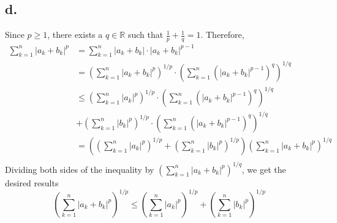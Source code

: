 \documentclass[11pt]{article}
\begin{document}
\subsection*{d.}
Since $p\ge 1$, there exists a $q \in \mathbb{R}$ such that $\frac{1}{p}+ \frac{1}{q} = 1$. Therefore, 
\begin{equation*}
    \begin{aligned}
        \sum_{k=1}^n |a_k + b_k|^p 
        &= \sum_{k=1}^n |a_k + b_k| \cdot |a_k+b_k|^{p-1} \\
        &= \left(\sum_{k=1}^n |a_k + b_k|^p \right)^{1/p} \cdot 
        \left( \sum_{k=1}^n (|a_k + b_k|^{p-1} )^q \right)^{1/q} \\
        &\le \left(\sum_{k=1}^n |a_k|^p \right)^{1/p} \cdot
        \left( \sum_{k=1}^n (|a_k + b_k|^{p-1} )^q \right)^{1/q} \\
        & +\left(\sum_{k=1}^n |b_k|^p \right)^{1/p} \cdot
        \left( \sum_{k=1}^n (|a_k + b_k|^{p-1} )^q \right)^{1/q} \\
        &= \left(\left(\sum_{k=1}^n |a_k|^p \right)^{1/p} 
        + \left(\sum_{k=1}^n |b_k|^p \right)^{1/p} \right)
        \left( \sum_{k=1}^n |a_k + b_k|^p \right)^{1/q} \\
    \end{aligned}
\end{equation*}
Dividing both sides of the inequality by $\left( \sum_{k=1}^n |a_k + b_k|^p \right)^{1/q}$, we get the desired results
\[
    \left(\sum_{k=1}^n |a_k+b_k|^p \right)^{1/p} \le \left(\sum_{k=1}^n |a_k|^p \right)^{1/p} 
    + \left(\sum_{k=1}^n |b_k|^p \right)^{1/p}
\]
\pagebreak
\end{document}

